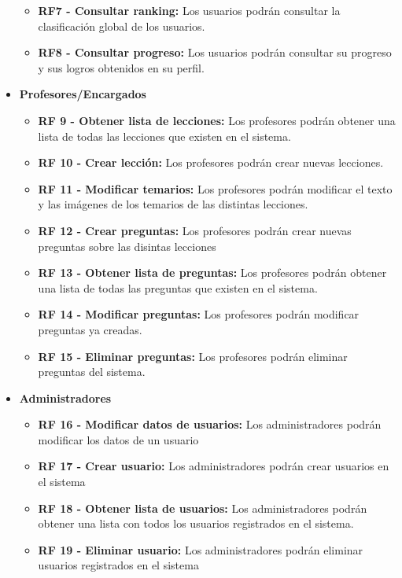 \begin{itemize}
\begin{itemize}
              \item \textbf{RF7 - Consultar ranking: }Los usuarios podrán consultar la clasificación global de los usuarios.
              \item \textbf{RF8 - Consultar progreso: } Los usuarios podrán consultar su progreso y sus logros obtenidos en su perfil.
          \end{itemize}
    \item \textbf{Profesores/Encargados}
          \begin{itemize}
              \item \textbf{RF 9 - Obtener lista de lecciones: } Los profesores podrán obtener una lista de todas las lecciones que existen en el sistema.
              \item \textbf{RF 10 - Crear lección: }Los profesores podrán crear nuevas lecciones.
              \item \textbf{RF 11 - Modificar temarios: }Los profesores podrán modificar el texto y las imágenes de los temarios de las distintas lecciones.
              \item \textbf{RF 12 - Crear preguntas: } Los profesores podrán crear nuevas preguntas sobre las disintas lecciones
              \item \textbf{RF 13 - Obtener lista de preguntas: } Los profesores podrán obtener una lista de todas las preguntas que existen en el sistema.
              \item \textbf{RF 14 - Modificar preguntas: } Los profesores podrán modificar preguntas ya creadas.
              \item \textbf{RF 15 - Eliminar preguntas: } Los profesores podrán eliminar preguntas del sistema.
          \end{itemize}
    \item \textbf{Administradores}
          \begin{itemize}
              \item \textbf{RF 16 - Modificar datos de usuarios: }Los administradores podrán modificar los datos de un usuario
              \item \textbf{RF 17 - Crear usuario: }Los administradores podrán crear usuarios en el sistema
              \item \textbf{RF 18 - Obtener lista de usuarios: } Los administradores podrán obtener una lista con todos los usuarios registrados en el sistema.
              \item \textbf{RF 19 - Eliminar usuario: }Los administradores podrán eliminar usuarios registrados en el sistema
          \end{itemize}
\end{itemize}

